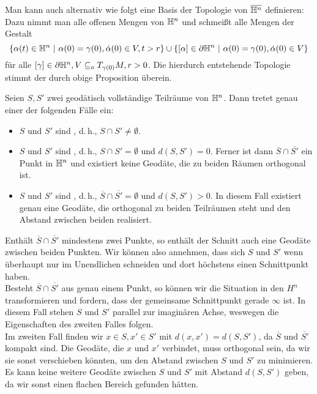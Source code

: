 \documentclass{book}
\begin{document}
\Bem{}
Man kann auch alternativ wie folgt eine Basis der Topologie von $\overline{\mathbb{H}^n}$ definieren: Dazu nimmt man alle offenen Mengen von $\mathbb{H}^n$ und schmeißt alle Mengen der Gestalt
\[ \{ \alpha(t) \in \H^n~|~ \alpha(0) = \gamma(0), \dot{\alpha}(0)  \in V ,t > r\} \cup \set{ [\alpha] \in \partial \H^n }{\alpha(0) = \gamma(0),\dot{\alpha}(0)  \in V} \]
für alle $[\gamma] \in \partial \mathbb{H}^n, V \subseteq_o T_{\gamma(0)}M, r > 0$. Die hierdurch entstehende Topologie stimmt der durch obige Proposition überein.

\Prop{}
Seien $S,S'$ zwei geodätisch vollständige Teilräume von $\mathbb{H}^n$. Dann tretet genau einer der folgenden Fälle ein:
\begin{itemize}
	\item $S$ und $S'$ sind , d.\,h., $S\cap S'\neq \emptyset$.
	\item $S$ und $S'$ sind , d.\,h., $S\cap S' = \emptyset$ und $d(S, S') = 0$. Ferner ist dann $\overline{S} \cap \overline{S'}$ ein Punkt in $\mathbb{H}^n$ und existiert keine Geodäte, die zu beiden Räumen orthogonal ist.
	\item $S$ und $S'$ sind , d.\,h., $\overline{S}\cap \overline{S'} = \emptyset$ und $d(S, S') > 0$. In diesem Fall existiert genau eine Geodäte, die orthogonal zu beiden Teilräumen steht und den Abstand zwischen beiden realisiert.
\end{itemize}
\begin{Beweis}{}
	Enthält $\overline{S} \cap \overline{S'}$ mindestens zwei Punkte, so enthält der Schnitt auch eine Geodäte zwischen beiden Punkten. Wir können also annehmen, dass sich $S$ und $S'$ wenn überhaupt nur im Unendlichen schneiden und dort höchstens einen Schnittpunkt haben.\\
	Besteht $\overline{S} \cap \overline{S'}$ aus genau einem Punkt, so können wir die Situation in den $H^n$ transformieren und fordern, dass der gemeinsame Schnittpunkt gerade $\infty$ ist. In diesem Fall stehen $S$ und $S'$ parallel zur imaginären Achse, weswegen die Eigenschaften des zweiten Falles folgen.\\
	Im zweiten Fall finden wir $x\in S, x' \in S'$ mit $d(x,x') = d(S, S')$, da $\overline{S}$ und $\overline{S'}$ kompakt sind. Die Geodäte, die $x$ und $x'$ verbindet, muss orthogonal sein, da wir sie sonst verschieben könnten, um den Abstand zwischen $S$ und $S'$ zu minimieren. Es kann keine weitere Geodäte zwischen $S$ und $S'$ mit Abstand $d(S, S')$ geben, da wir sonst einen flachen Bereich gefunden hätten.
\end{Beweis}
\end{document}
